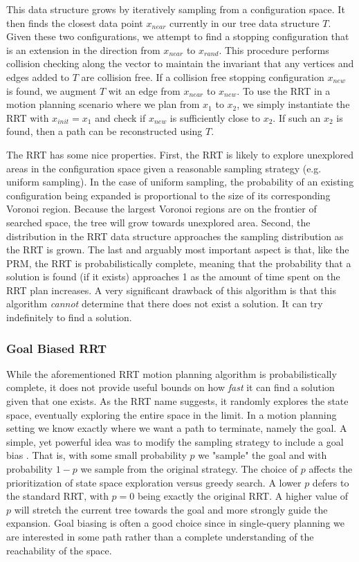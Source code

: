 This data structure grows by iteratively sampling from a configuration space. It then finds the closest data point $x_{near}$ currently in our tree data structure $T$. Given these two configurations, we attempt to find a stopping configuration that is an extension in the direction from $x_{near}$ to $x_{rand}$. This procedure performs collision checking along the vector to maintain the invariant that any vertices and edges added to $T$ are collision free. If a collision free stopping configuration $x_{new}$ is found, we augment $T$ wit an edge from $x_{near}$ to $x_{new}$. To use the RRT in a motion planning scenario where we plan from $x_1$ to $x_2$, we simply instantiate the RRT with $x_{init} = x_1$ and check if $x_{new}$ is sufficiently close to $x_2$. If such an $x_2$ is found, then a path can be reconstructed using $T$.

The RRT has some nice properties. First, the RRT is likely to explore unexplored areas in the configuration space given a reasonable sampling strategy (e.g. uniform sampling). In the case of uniform sampling, the probability of an existing configuration being expanded is proportional to the size of its corresponding Voronoi region. Because the largest Voronoi regions are on the frontier of searched space, the tree will grow towards unexplored area. Second, the distribution in the RRT data structure approaches the sampling distribution as the RRT is grown. The last and arguably most important aspect is that, like the PRM, the RRT is probabilistically complete, meaning that the probability that a solution is found (if it exists) approaches 1 as the amount of time spent on the RRT plan increases. A very significant drawback of this algorithm is that this algorithm \emph{cannot} determine that there does not exist a solution. It can try indefinitely to find a solution.

\subsubsection{Goal Biased RRT} \label{planning:goal-bias}
While the aforementioned RRT motion planning algorithm is probabilistically complete, it does not provide useful bounds on how \emph{fast} it can find a solution given that one exists. As the RRT name suggests, it randomly explores the state space, eventually exploring the entire space in the limit. In a motion planning setting we know exactly where we want a path to terminate, namely the goal. A simple, yet powerful idea was to modify the sampling strategy to include a goal bias \cite{lavalle:rrt}. That is, with some small probability $p$ we "sample" the goal and with probability $1-p$ we sample from the original strategy. The choice of $p$ affects the prioritization of state space exploration versus greedy search. A lower $p$ defers to the standard RRT, with $p=0$ being exactly the original RRT. A higher value of $p$ will stretch the current tree towards the goal and more strongly guide the expansion. Goal biasing is often a good choice since in single-query planning we are interested in some path rather than a complete understanding of the reachability of the space.

